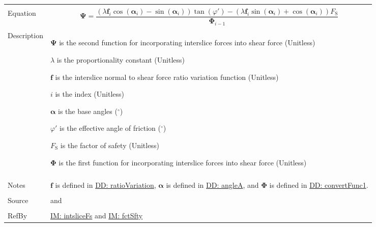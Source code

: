 \documentclass[12pt]{article}
\begin{document}
\begin{minipage}{\textwidth}
\begin{tabular}{>{\raggedright}p{}>{\raggedright\arraybackslash}p{}}
\\ \midrule \\
Equation & \begin{displaymath}
           \mathbf{Ψ}=\frac{\left(λ {\mathbf{f}}_{i} \cos\left({\mathbf{α}}_{i}\right)-\sin\left({\mathbf{α}}_{i}\right)\right) \tan\left(φ'\right)-\left(λ {\mathbf{f}}_{i} \sin\left({\mathbf{α}}_{i}\right)+\cos\left({\mathbf{α}}_{i}\right)\right) {F_{\text{S}}}}{{\mathbf{Φ}}_{i-1}}
           \end{displaymath}
\\ \midrule \\
Description & \begin{symbDescription}
              \item{$\mathbf{Ψ}$ is the second function for incorporating interslice forces into shear force (Unitless)}
              \item{$λ$ is the proportionality constant (Unitless)}
              \item{$\mathbf{f}$ is the interslice normal to shear force ratio variation function (Unitless)}
              \item{$i$ is the index (Unitless)}
              \item{$\mathbf{α}$ is the base angles (${}^{\circ}$)}
              \item{$φ'$ is the effective angle of friction (${}^{\circ}$)}
              \item{${F_{\text{S}}}$ is the factor of safety (Unitless)}
              \item{$\mathbf{Φ}$ is the first function for incorporating interslice forces into shear force (Unitless)}
              \end{symbDescription}
\\ \midrule \\
Notes & $\mathbf{f}$ is defined in \hyperref[DD:ratioVariation]{DD: ratioVariation}, $\mathbf{α}$ is defined in \hyperref[DD:angleA]{DD: angleA}, and $\mathbf{Φ}$ is defined in \hyperref[DD:convertFunc1]{DD: convertFunc1}.
        
\\ \midrule \\
Source & \cite{chen2005} and \cite{karchewski2012}
         
\\ \midrule \\
RefBy & \hyperref[IM:intsliceFs]{IM: intsliceFs} and \hyperref[IM:fctSfty]{IM: fctSfty}
        
\\ \bottomrule
\end{tabular}
\end{minipage}
\end{document}
